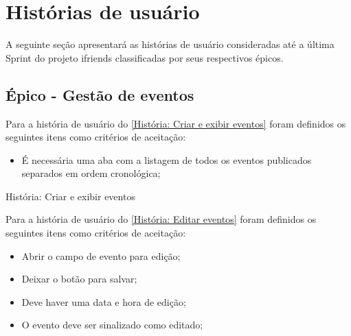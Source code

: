 \chapter{Histórias de usuário}
\label{historias de usuario}
A seguinte seção apresentará as histórias de usuário consideradas até a última \gls{Sprint} do projeto \gls{ifriends} classificadas por seus respectivos épicos.
\section{Épico - Gestão de eventos}
\label{gestão_eventos}
Para a história de usuário do \autoref{História: Criar e exibir eventos} foram definidos os seguintes itens como critérios de aceitação:

\begin{itemize}
\item É necessária uma aba com a listagem de todos os eventos publicados separados em ordem cronológica;
\end{itemize}

\def\arraystretch{2}
\begin{quadro}[htb]
\centering
\ABNTEXfontereduzida
\caption[História: Criar e exibir eventos]{História: Criar e exibir eventos}
\label{História: Criar e exibir eventos}
\end{quadro}
\FloatBarrier 

Para a história de usuário do \autoref{História: Editar eventos} foram definidos os seguintes itens como critérios de aceitação:

\begin{itemize}
\item Abrir o campo de evento para edição;
\item Deixar o botão para salvar;
\item Deve haver uma data e hora de edição;
\item O evento deve ser sinalizado como editado;
\end{itemize}

